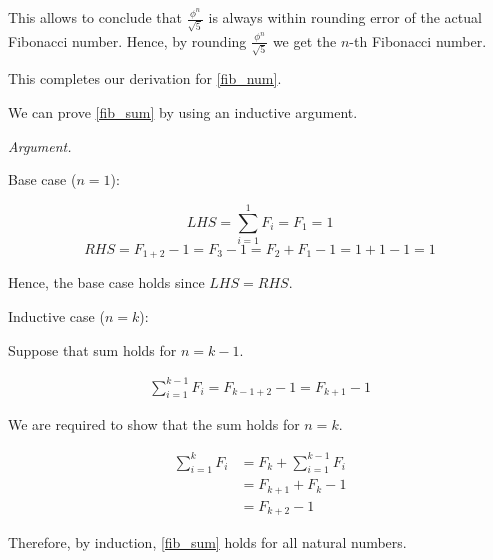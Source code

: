 \documentclass{uom-coursework}
\begin{document}
This allows to conclude that $\frac{\phi^n}{\sqrt{5}}$ is always
within rounding error of the actual Fibonacci number. Hence, by
rounding $\frac{\phi^n}{\sqrt{5}}$ we get the $n$-th Fibonacci
number.

This completes our derivation for \ref{fib_num}.

\vspace{1em}

We can prove \ref{fib_sum} by using an inductive argument.

\vspace{1em}

\textit{Argument.}

Base case ($n = 1$): 

$$LHS = \sum_{i = 1}^{1} F_i = F_1 = 1$$ 
$$RHS = F_{1 + 2} - 1 = F_3 - 1 = F_2 + F_1 - 1 = 1 + 1 - 1 =
1$$

Hence, the base case holds since $LHS = RHS$.

\vspace{1em}

Inductive case ($n = k$):

Suppose that sum holds for $n = k - 1$. 

\begin{align}
  \sum_{i = 1}^{k - 1} F_i = F_{k - 1 + 2} - 1 = F_{k + 1} - 1
  \label{ind_hyp}
\end{align}

We are required to show that the sum holds for $n = k$.

\begin{align*}
  \sum_{i = 1}^{k} F_i & = F_{k} + \sum_{i = 1}^{k - 1} F_i\\
                       & = F_{k + 1} + F_{k} - 1\\
                       & = F_{k + 2} - 1 
\end{align*}

Therefore, by induction, \ref{fib_sum} holds for all natural
numbers.
\end{document}
